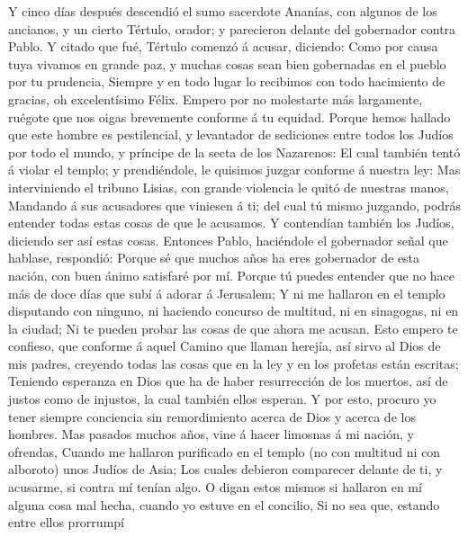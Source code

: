  Y cinco días después descendió el sumo sacerdote Ananías,
con algunos de los ancianos, y un cierto Tértulo, orador; y parecieron
delante del gobernador contra Pablo.  Y citado que fué,
Tértulo comenzó á acusar, diciendo: Como por causa tuya vivamos en
grande paz, y muchas cosas sean bien gobernadas en el pueblo por tu
prudencia,  Siempre y en todo lugar lo recibimos con todo
hacimiento de gracias, oh excelentísimo Félix.  Empero por
no molestarte más largamente, ruégote que nos oigas brevemente conforme
á tu equidad.  Porque hemos hallado que este hombre es
pestilencial, y levantador de sediciones entre todos los Judíos por todo
el mundo, y príncipe de la secta de los Nazarenos:  El
cual también tentó á violar el templo; y prendiéndole, le quisimos
juzgar conforme á nuestra ley:  Mas interviniendo el
tribuno Lisias, con grande violencia le quitó de nuestras manos,
 Mandando á sus acusadores que viniesen á ti; del cual tú
mismo juzgando, podrás entender todas estas cosas de que le acusamos.
 Y contendían también los Judíos, diciendo ser así estas
cosas.  Entonces Pablo, haciéndole el gobernador señal
que hablase, respondió: Porque sé que muchos años ha eres gobernador de
esta nación, con buen ánimo satisfaré por mí.  Porque tú
puedes entender que no hace más de doce días que subí á adorar á
Jerusalem;  Y ni me hallaron en el templo disputando con
ninguno, ni haciendo concurso de multitud, ni en sinagogas, ni en la
ciudad;  Ni te pueden probar las cosas de que ahora me
acusan.  Esto empero te confieso, que conforme á aquel
Camino que llaman herejía, así sirvo al Dios de mis padres, creyendo
todas las cosas que en la ley y en los profetas están escritas;
 Teniendo esperanza en Dios que ha de haber resurrección
de los muertos, así de justos como de injustos, la cual también ellos
esperan.  Y por esto, procuro yo tener siempre conciencia
sin remordimiento acerca de Dios y acerca de los hombres.
 Mas pasados muchos años, vine á hacer limosnas á mi
nación, y ofrendas,  Cuando me hallaron purificado en el
templo (no con multitud ni con alboroto) unos Judíos de Asia;
 Los cuales debieron comparecer delante de ti, y
acusarme, si contra mí tenían algo.  O digan estos mismos
si hallaron en mí alguna cosa mal hecha, cuando yo estuve en el
concilio,  Si no sea que, estando entre ellos prorrumpí
